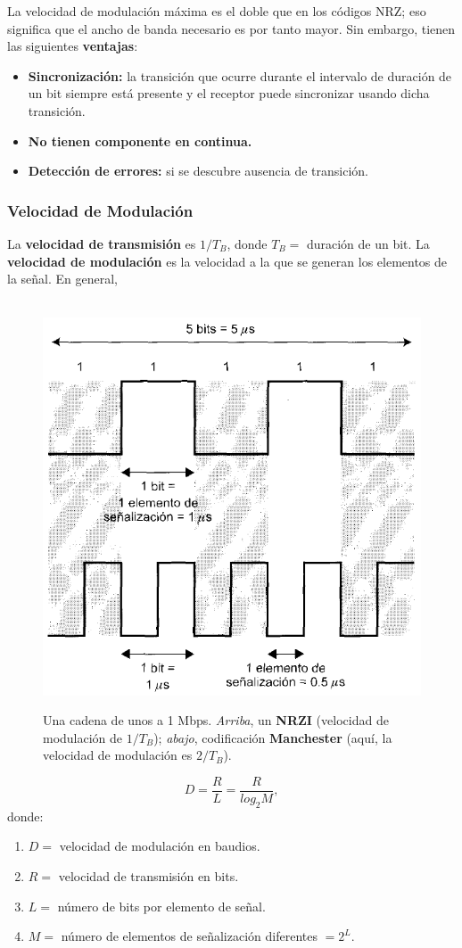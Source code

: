 \documentclass[10pt,a4paper]{article}
\begin{document}
La  velocidad de modulación máxima es el doble que en los códigos NRZ; eso significa que el ancho de banda necesario es por tanto mayor. Sin embargo, tienen las siguientes \textbf{ventajas}:
\begin{itemize}
\item \textbf{Sincronización:} la transición que ocurre durante el intervalo de duración de un bit siempre está presente y el receptor puede sincronizar usando dicha transición.
\item \textbf{No tienen componente en continua.}
\item \textbf{Detección de errores:} si se descubre ausencia de transición.
\end{itemize}

\subsubsection{Velocidad de Modulación}

La \textbf{velocidad de transmisión} es $1/T_B$, donde $T_B=$ duración de un bit. La \textbf{velocidad de modulación} es la velocidad a la que se generan los elementos de la señal. En general,

\begin{figure}
  \caption{Una cadena de unos a 1 Mbps. \textit{Arriba}, un \textbf{NRZI} (velocidad de modulación de $1/T_B$); \textit{abajo}, codificación \textbf{Manchester} (aquí, la velocidad de modulación es $2/T_B$).}
  \label{fig:vel_modulacion}  
  \centering
  \hbox{
	\includegraphics[width=0.5\textwidth-\fboxrule-\fboxrule]{imgs/vel_modulacion.png}}
\end{figure}

\[D = \frac{R}{L} = \frac{R}{log_2 M},\]
donde:
\begin{enumerate}[ ]
\item $D=$ velocidad de modulación en baudios.
\item $R=$ velocidad de transmisión en bits.
\item $L=$ número de bits por elemento de señal.
\item $M=$ número de elementos de señalización diferentes $=2^L$.
\end{enumerate}
\end{document}
